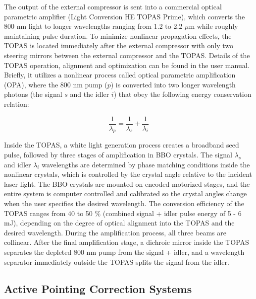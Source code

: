 The output of the external compressor is sent into a commercial optical parametric amplifier (Light Conversion HE TOPAS Prime), which converts the 800 nm light to longer wavelengths ranging from 1.2 to 2.2 $\mu$m while roughly maintaining pulse duration. To minimize nonlinear propagation effects, the TOPAS is located immediately after the external compressor with only two steering mirrors between the external compressor and the TOPAS. Details of the TOPAS operation, alignment and optimization can be found in the user manual. Briefly, it utilizes a nonlinear process called optical parametric amplification (OPA), where the 800 nm pump ($p$) is converted into two longer wavelength photons (the signal $s$ and the idler $i$) that obey the following energy conservation relation:

\begin{equation}
\frac{1}{\lambda_p} = \frac{1}{\lambda_s} + \frac{1}{\lambda_i}
\end{equation}

Inside the TOPAS, a white light generation process creates a broadband seed pulse, followed by three stages of amplification in BBO crystals. The signal $\lambda_s$ and idler $\lambda_i$ wavelengths are determined by phase matching conditions inside the nonlinear crystals, which is controlled by the crystal angle relative to the incident laser light. The BBO crystals are mounted on encoded motorized stages, and the entire system is computer controlled and calibrated so the crystal angles change when the user specifies the desired wavelength. The conversion efficiency of the TOPAS ranges from 40 to 50 \% (combined signal + idler pulse energy of 5 - 6 mJ), depending on the degree of optical alignment into the TOPAS and the desired wavelength. During the amplification process, all three beams are collinear. After the final amplification stage, a dichroic mirror inside the TOPAS separates the depleted 800 nm pump from the signal + idler, and a wavelength separator immediately outside the TOPAS splits the signal from the idler.

\subsection{Active Pointing Correction Systems}

